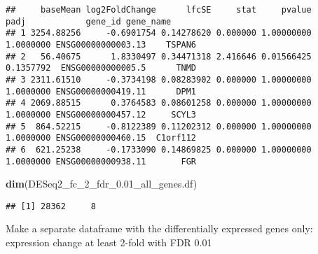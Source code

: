\documentclass[]{book}
\newenvironment{Shaded}{\begin{snugshade}}{\end{snugshade}}
\newcommand{\KeywordTok}[1]{\textcolor[rgb]{0.13,0.29,0.53}{\textbf{#1}}}
\newcommand{\DecValTok}[1]{\textcolor[rgb]{0.00,0.00,0.81}{#1}}
\newcommand{\FloatTok}[1]{\textcolor[rgb]{0.00,0.00,0.81}{#1}}
\newcommand{\StringTok}[1]{\textcolor[rgb]{0.31,0.60,0.02}{#1}}
\newcommand{\CommentTok}[1]{\textcolor[rgb]{0.56,0.35,0.01}{\textit{#1}}}
\newcommand{\OperatorTok}[1]{\textcolor[rgb]{0.81,0.36,0.00}{\textbf{#1}}}
\newcommand{\NormalTok}[1]{#1}
\begin{document}
\begin{verbatim}
##     baseMean log2FoldChange      lfcSE     stat     pvalue      padj            gene_id gene_name
## 1 3254.88256     -0.6901754 0.14278620 0.000000 1.00000000 1.0000000 ENSG00000000003.13    TSPAN6
## 2   56.40675      1.8330497 0.34471318 2.416646 0.01566425 0.1357792  ENSG00000000005.5      TNMD
## 3 2311.61510     -0.3734198 0.08283902 0.000000 1.00000000 1.0000000 ENSG00000000419.11      DPM1
## 4 2069.88515      0.3764583 0.08601258 0.000000 1.00000000 1.0000000 ENSG00000000457.12     SCYL3
## 5  864.52215     -0.8122389 0.11202312 0.000000 1.00000000 1.0000000 ENSG00000000460.15  C1orf112
## 6  621.25238     -0.1733090 0.14869825 0.000000 1.00000000 1.0000000 ENSG00000000938.11       FGR
\end{verbatim}

\begin{Shaded}
\begin{Highlighting}[]
\KeywordTok{dim}\NormalTok{(DESeq2_fc_2_fdr_}\FloatTok{0.}\NormalTok{01_all_genes.df)}
\end{Highlighting}
\end{Shaded}

\begin{verbatim}
## [1] 28362     8
\end{verbatim}

Make a separate dataframe with the differentially expressed genes only:
expression change at least 2-fold with FDR 0.01

\begin{Shaded}
\end{Shaded}
\end{document}
